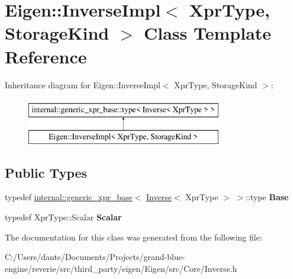 \hypertarget{class_eigen_1_1_inverse_impl}{}\section{Eigen\+::Inverse\+Impl$<$ Xpr\+Type, Storage\+Kind $>$ Class Template Reference}
\label{class_eigen_1_1_inverse_impl}
Inheritance diagram for Eigen\+::Inverse\+Impl$<$ Xpr\+Type, Storage\+Kind $>$\+:\begin{figure}[H]
\begin{center}
\leavevmode
\includegraphics[height=2.000000cm]{class_eigen_1_1_inverse_impl}
\end{center}
\end{figure}
\subsection*{Public Types}
\begin{DoxyCompactItemize}
\item 
\mbox{\label{class_eigen_1_1_inverse_impl_aadc85dd01febe95ea4372e2f9f77aa92}} 
typedef \mbox{\hyperlink{struct_eigen_1_1internal_1_1generic__xpr__base}{internal\+::generic\+\_\+xpr\+\_\+base}}$<$ \mbox{\hyperlink{class_eigen_1_1_inverse}{Inverse}}$<$ Xpr\+Type $>$ $>$\+::type {\bfseries Base}
\item 
\mbox{\label{class_eigen_1_1_inverse_impl_aafdfa1eaae4244865ad05d1c76d86f27}} 
typedef Xpr\+Type\+::\+Scalar {\bfseries Scalar}
\end{DoxyCompactItemize}


The documentation for this class was generated from the following file\+:\begin{DoxyCompactItemize}
\item 
C\+:/\+Users/dante/\+Documents/\+Projects/grand-\/blue-\/engine/reverie/src/third\+\_\+party/eigen/\+Eigen/src/\+Core/Inverse.\+h\end{DoxyCompactItemize}
